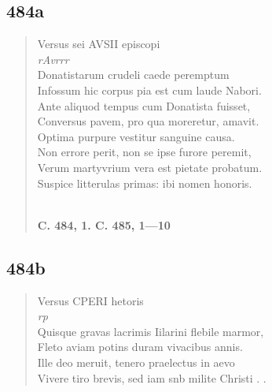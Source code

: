 \documentclass[11pt, a4paper]{report}
\begin{document}
            \subsection*{484a}
      \begin{verse}
      Versus sei AVSII episcopi \\ \textit{rAvrrr} \\ Donatistarum crudeli caede peremptum \\ Infossum hic corpus pia est cum laude Nabori. \\ Ante aliquod tempus cum Donatista fuisset, \\ Conversus pavem, pro qua moreretur, amavit. \\ Optima purpure vestitur sanguine causa. \\ Non errore perit, non se ipse furore peremit, \\ Verum martyvrium vera est pietate probatum. \\ Suspice litterulas primas: ibi nomen honoris. \\ 
        ﻿\pagebreak 
    \begin{center} \textbf{C. 484, 1. C. 485, 1—10} \end{center}
      \end{verse}
  
            \subsection*{484b}
      \begin{verse}
      Versus CPERI hetoris \\ \textit{rp} \\ Quisque gravas lacrimis Iilarini flebile marmor, \\ Fleto aviam potins duram vivacibus annis. \\ Ille deo meruit, tenero praelectus in aevo \\ Vivere tiro brevis, sed iam snb milite Christi . . \\ 
      \end{verse}
  
\end{document}
